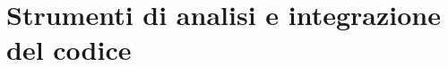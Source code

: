 \section{Strumenti di analisi e integrazione del codice}\label{strumenti_analisi_integrazione_codice}